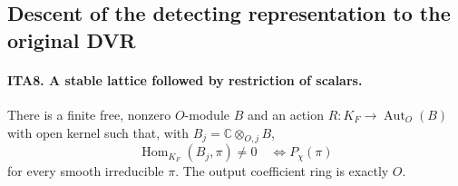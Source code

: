 \subsection{Descent of the detecting representation to the original DVR}

\paragraph{ITA8. A stable lattice followed by restriction of scalars.}
\label{claim:ITA8}
There is a finite free, nonzero $O$-module $B$ and an action
$R:K_F\to\operatorname{Aut}_O(B)$ with open kernel such
that, with $B_j=\mathbb C\otimes_{O,j}B$,
\[
              \operatorname{Hom}_{K_F}(B_j,\pi)\ne0
                             \quad\Longleftrightarrow P_\chi(\pi)
                                                               \tag{ITA.14}
\]
for every smooth irreducible $\pi$.  The output coefficient
ring is exactly $O$.
